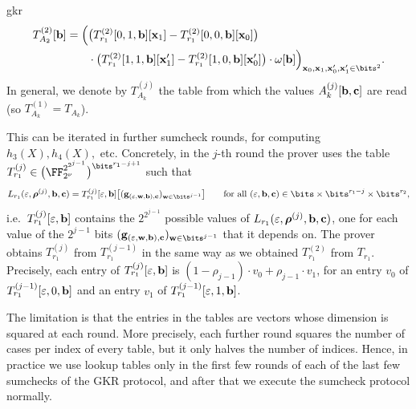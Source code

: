 \begin{lncsappendix}{gkr}
$$
\begin{aligned}T_{A_2}^{(2)}[\bb]=\Big(&\big(T_{r_1}^{(2)}[0,1,\bb][\xx_1]-T_{r_1}^{(2)}[0,0,\bb][\xx_0]\big)\\ &\cdot\big(T_{r_1}^{(2)}[1,1,\bb][\xx_1']-T_{r_1}^{(2)}[1,0,\bb][\xx_0']\big)\cdot\omega[\bb]\Big)_{\xx_0,\xx_1,\xx_0',\xx_1'\in\bits^2}.\end{aligned}
$$
In general, we denote by $T_{A_k}^{(j)}$ the table from which the values $A_k^{(j)}[\mathbf{b},\mathbf{c}]$ are read (so $T_{A_k}^{(1)}= T_{A_k}$).
%

\bigskip

This can be iterated in further sumcheck rounds, for computing $h_3(X), h_4(X),$ etc. Concretely, in the $j$-th round the prover uses the table $T_{r_1}^{(j)}\in \big(\comfield^{2^{2^{j-1}}}\big)^{\bits^{r_1-j+1}}$ such that
%
\begin{equation}\label{e:T_r1_rounds}
L_{r_1}(\eps,\bm{\rho}^{(j)},\bb,\cc)=T_{r_1}^{(j)}[\eps,\bb]\big[(\bfg_{(\eps,\ww,\bb),\cc})_{\ww\in\bits^{j-1}}\big] \qquad \text{for all } (\eps,\bb,\cc)\in \bits\times\bits^{r_1-j}\times\bits^{r_2},
\end{equation}
%
\noindent i.e.\ $T_{r_1}^{(j)}[\varepsilon,\mathbf{b}]$ contains the $2^{2^{j-1}}$ possible values of $L_{r_1}(\varepsilon,\bm{\rho}^{(j)},\mathbf{b},\mathbf{c})$, one for each value of the $2^{j-1}$ bits $(\bfg_{(\eps,\ww,\bb),\cc})_{\ww\in\bits^{j-1}}$ that it depends on. The prover obtains $T_{r_1}^{(j)}$ from $T_{r_1}^{(j-1)}$ in the same way as we obtained $T_{r_1}^{(2)}$ from $T_{r_1}$. Precisely, each entry of $T_{r_1}^{(j)}[\varepsilon,\mathbf{b}]$ is $(1-\rho_{j-1})\cdot v_0+\rho_{j-1}\cdot v_1$, for an entry $v_0$ of $T_{r_1}^{(j-1)}[\varepsilon,0,\mathbf{b}]$ and an entry $v_1$ of $T_{r_1}^{(j-1)}[\varepsilon,1,\mathbf{b}]$. 

The limitation is that the entries in the tables are vectors whose dimension is squared at each round. More precisely, each further round squares the number of cases per index of every table, but it only halves the number of indices.
Hence, in practice we use lookup tables only in the first few rounds of each of the last few sumchecks of the GKR protocol, and after that we execute the sumcheck protocol normally.  


\end{lncsappendix}
